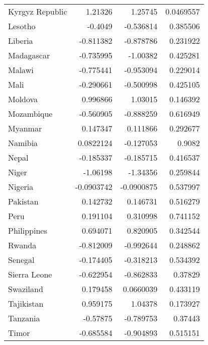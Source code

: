 \documentclass{article}
\begin{document}
\begin{table}[]
\begin{tabular}{lrrr}
 Kyrgyz Republic                  &  1.21326    &  1.25745   &  0.0469557 \\
 Lesotho                          & -0.4049     & -0.536814  &  0.385506  \\
 Liberia                          & -0.811382   & -0.878786  &  0.231922  \\
 Madagascar                       & -0.735995   & -1.00382   &  0.425281  \\
 Malawi                           & -0.775441   & -0.953094  &  0.229014  \\
 Mali                             & -0.290661   & -0.500998  &  0.425105  \\
 Moldova                          &  0.996866   &  1.03015   &  0.146392  \\
 Mozambique                       & -0.560905   & -0.888259  &  0.616949  \\
 Myanmar                          &  0.147347   &  0.111866  &  0.292677  \\
 Namibia                          &  0.0822124  & -0.127053  &  0.9082    \\
 Nepal                            & -0.185337   & -0.185715  &  0.416537  \\
 Niger                            & -1.06198    & -1.34356   &  0.259844  \\
 Nigeria                          & -0.0903742  & -0.0900875 &  0.537997  \\
 Pakistan                         &  0.142732   &  0.146731  &  0.516279  \\
 Peru                             &  0.191104   &  0.310998  &  0.741152  \\
 Philippines                      &  0.694071   &  0.820905  &  0.342544  \\
 Rwanda                           & -0.812009   & -0.992644  &  0.248862  \\
 Senegal                          & -0.174405   & -0.318213  &  0.534392  \\
 Sierra Leone                     & -0.622954   & -0.862833  &  0.37829   \\
 Swaziland                        &  0.179458   &  0.0660039 &  0.433119  \\
 Tajikistan                       &  0.959175   &  1.04378   &  0.173927  \\
 Tanzania                         & -0.57875    & -0.789753  &  0.37443   \\
 Timor                            & -0.685584   & -0.904893  &  0.515151  \\

\end{tabular}
\end{table}
\end{document}
